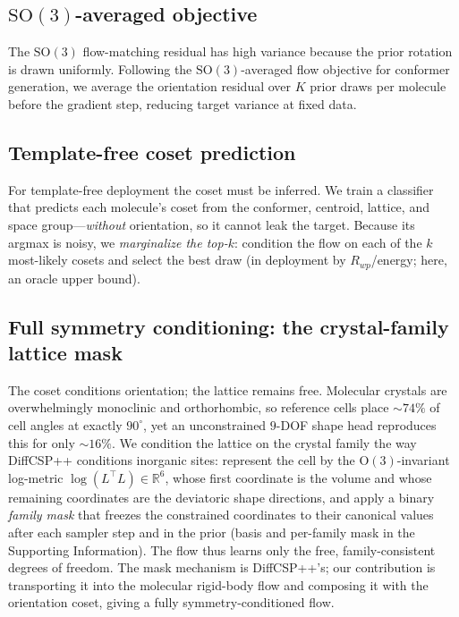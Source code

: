 \documentclass[journal=acsodf,manuscript=article]{achemso}
\begin{document}
\subsection{$\mathrm{SO}(3)$-averaged objective}
The $\mathrm{SO}(3)$ flow-matching residual has high variance because the prior
rotation is drawn uniformly. Following the $\mathrm{SO}(3)$-averaged flow objective
for conformer generation\cite{cao2025so3averaged}, we average the orientation
residual over $K$ prior draws per molecule before the gradient step, reducing
target variance at fixed data.

\subsection{Template-free coset prediction}
For template-free deployment the coset must be inferred. We train a classifier that
predicts each molecule's coset from the conformer, centroid, lattice, and space
group---\emph{without} orientation, so it cannot leak the target. Because its
argmax is noisy, we \emph{marginalize the top-$k$}: condition the flow on each of
the $k$ most-likely cosets and select the best draw (in deployment by
$R_{wp}$/energy; here, an oracle upper bound).

\subsection{Full symmetry conditioning: the crystal-family lattice mask}
\label{sec:family}
The coset conditions orientation; the lattice remains free. Molecular crystals are
overwhelmingly monoclinic and orthorhombic, so reference cells place $\sim\!74\%$
of cell angles at exactly $90^\circ$, yet an unconstrained $9$-DOF shape head
reproduces this for only $\sim\!16\%$. We condition the lattice on the crystal
family the way DiffCSP++\cite{jiao2024diffcsppp} conditions inorganic sites:
represent the cell by the $\mathrm{O}(3)$-invariant log-metric
$\log(L^\top L)\in\mathbb{R}^6$, whose first coordinate is the volume and whose
remaining coordinates are the deviatoric shape directions, and apply a binary
\emph{family mask} that freezes the constrained coordinates to their canonical
values after each sampler step and in the prior (basis and per-family mask in the
Supporting Information). The flow thus learns only the free, family-consistent
degrees of freedom. The mask mechanism is DiffCSP++'s; our contribution is
transporting it into the molecular rigid-body flow and composing it with the
orientation coset, giving a fully symmetry-conditioned flow.
\end{document}
